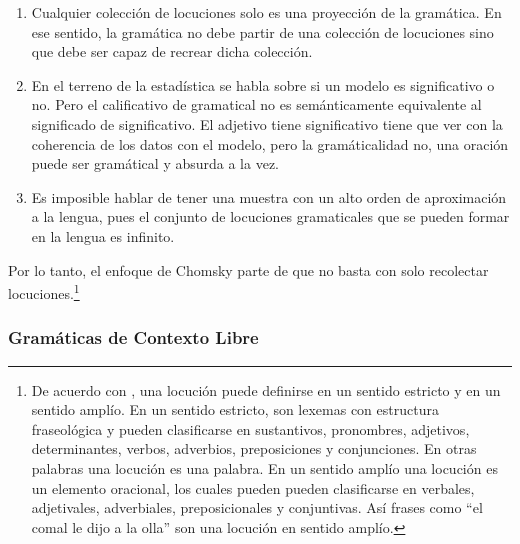 \begin{enumerate}
	\item Cualquier colección de locuciones solo es una proyección de la gramática. En ese sentido, la gramática no debe partir de una colección de locuciones sino que debe ser capaz de recrear dicha colección.
	
	\item En el terreno de la estadística se habla sobre si un modelo es significativo o no. Pero el calificativo de gramatical no es semánticamente equivalente al significado de significativo. El adjetivo tiene significativo tiene que ver con la coherencia de los datos con el modelo, pero la gramáticalidad no, una oración puede ser gramátical y absurda a la vez.
	
	\item Es imposible hablar de tener una muestra con un alto orden de aproximación a la lengua, pues el conjunto de locuciones gramaticales que se pueden formar en la lengua es infinito.
\end{enumerate}

Por lo tanto, el enfoque de Chomsky parte de que no basta con solo recolectar locuciones.\footnote{De acuerdo con \cite{orduna2011estudio}, una locución puede definirse en un sentido estricto y en un sentido amplío. En un sentido estricto, son lexemas con estructura fraseológica y pueden clasificarse en sustantivos, pronombres, adjetivos, determinantes, verbos, adverbios, preposiciones y conjunciones. En otras palabras una locución es una palabra. En un sentido amplío una locución es un elemento oracional, los cuales pueden pueden clasificarse en verbales, adjetivales, adverbiales, preposicionales y conjuntivas. Así frases como ``el comal le dijo a la olla'' son una locución en sentido amplío.} 

\subsubsection{Gramáticas de Contexto Libre}
\label{subsubsec:sec2112}

